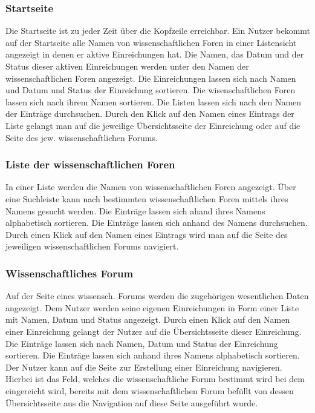 \subsubsection{Startseite}
\begin{description}
    \XXitem{} Die Startseite ist zu jeder Zeit über die Kopfzeile erreichbar.
     Ein Nutzer bekommt auf der Startseite alle Namen von wissenschaftlichen Foren
    in einer Listensicht angezeigt in denen er aktive Einreichungen hat.
    Die Namen, das Datum und der Status dieser aktiven Einreichungen werden unter den Namen der wissenschaftlichen
    Foren angezeigt.
     Die Einreichungen lassen sich nach Namen und Datum und Status
    der Einreichung sortieren. Die wisenschaftlichen Foren lassen sich nach ihrem Namen sortieren.
     Die Listen lassen sich nach den Namen der Einträge durchsuchen.
    \XXitem{} Durch den Klick auf den Namen eines Eintrags der Liste gelangt man auf die jeweilige Übersichtsseite
    der Einreichung oder auf die Seite des jew. wissenschaftlichen Forums.
\end{description}

\subsubsection{Liste der wissenschaftlichen Foren}
\begin{description}
    \XXitem{} In einer Liste werden die Namen von wissenschaftlichen Foren angezeigt.
     Über eine Suchleiste kann nach bestimmten wissenschaftlichen Foren mittels
    ihres Namens gesucht werden.
     Die Einträge lassen sich ahand ihres Namens alphabetisch sortieren.
     Die Einträge lassen sich anhand des Namens durchsuchen.
     Durch einen Klick auf den Namen eines Eintrags wird man auf die Seite des
    jeweiligen wissenschaftlichen Forums navigiert.
\end{description}

\subsubsection{Wissenschaftliches Forum}
\begin{description}
     Auf der Seite eines wissensch. Forums werden die zugehörigen wesentlichen Daten
    angezeigt. %
     Dem Nutzer werden seine eigenen Einreichungen in Form einer Liste mit Namen, Datum und Status
    angezeigt.
     Durch einen Klick auf den Namen einer Einreichung gelangt der Nutzer auf die Übersichtsseite
    dieser Einreichung.
     Die Einträge lassen sich nach Namen, Datum und Status
    der Einreichung sortieren.
     Die Einträge lassen sich anhand ihres Namens alphabetisch sortieren.
    \XXitem{} Der Nutzer kann auf die Seite zur Erstellung einer Einreichung navigieren. Hierbei ist
    das Feld, welches die wissenschaftliche Forum bestimmt wird bei dem eingereicht wird, bereits mit
    dem wissenschaftlichen Forum befüllt von dessen Übersichtsseite aus die Navigation auf diese
    Seite ausgeführt wurde.
\end{description}

